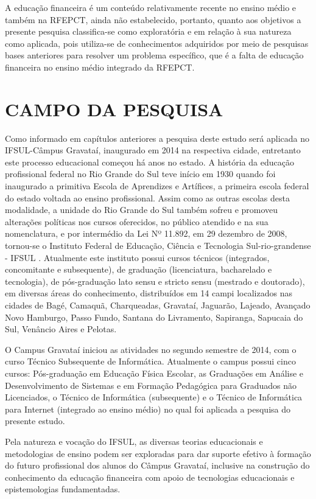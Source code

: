 A educação financeira é um conteúdo relativamente recente no ensino médio \cite{souza-flores2018} e também na RFEPCT, ainda não estabelecido, portanto, quanto aos objetivos a presente pesquisa classifica-se como exploratória e em relação à sua natureza como aplicada, pois utiliza-se de conhecimentos adquiridos por meio de pesquisas bases anteriores para resolver um problema específico, que é a falta de educação financeira no ensino médio integrado da RFEPCT.

\section{CAMPO DA PESQUISA}
Como informado em capítulos anteriores a pesquisa deste estudo será aplicada no IFSUL-Câmpus Gravataí, inaugurado em 2014 na respectiva cidade, entretanto este processo educacional começou há anos no estado. A história da educação profissional federal no Rio Grande do Sul teve início em 1930 quando foi inaugurado a primitiva Escola de Aprendizes e Artífices, a primeira escola federal do estado voltada ao ensino profissional. Assim como as outras escolas desta modalidade, a unidade do Rio Grande do Sul também sofreu e promoveu alterações políticas nos cursos oferecidos, no público atendido e na sua nomenclatura, e por intermédio da Lei Nº 11.892, em 29 dezembro de 2008, tornou-se o Instituto Federal de Educação, Ciência e Tecnologia Sul-rio-grandense - IFSUL \cite{ifsul2015}. Atualmente este instituto possui cursos técnicos (integrados, concomitante e subsequente), de graduação (licenciatura, bacharelado e tecnologia), de pós-graduação lato sensu e stricto sensu (mestrado e doutorado), em diversas áreas do conhecimento, distribuídos em 14 campi localizados nas cidades de Bagé, Camaquã, Charqueadas, Gravataí, Jaguarão, Lajeado, Avançado Novo Hamburgo, Passo Fundo, Santana do Livramento, Sapiranga, Sapucaia do Sul, Venâncio Aires e Pelotas.

O Campus Gravataí iniciou as atividades no segundo semestre de 2014, com o curso Técnico Subsequente de Informática. Atualmente o campus possui cinco cursos: Pós-graduação em Educação Física Escolar, as Graduações em Análise e Desenvolvimento de Sistemas e em Formação Pedagógica para Graduados não Licenciados, o Técnico de Informática (subsequente) e o Técnico de Informática para Internet (integrado ao ensino médio) no qual foi aplicada a pesquisa do presente estudo.

Pela natureza e vocação do IFSUL, as diversas teorias educacionais e metodologias de ensino podem ser exploradas para dar suporte efetivo à formação do futuro profissional dos alunos do Câmpus Gravataí, inclusive na construção do conhecimento da educação financeira com apoio de tecnologias educacionais e epistemologias fundamentadas.

